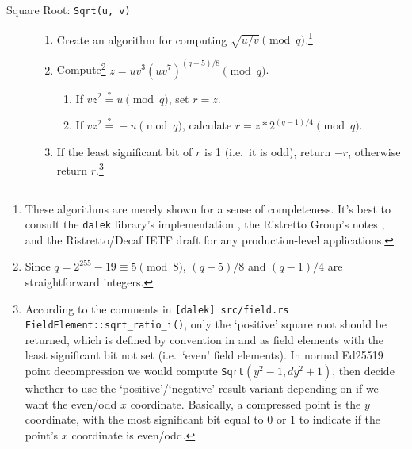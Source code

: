 \begin{description}
    \item [Square Root: {\tt Sqrt(u, v)}] \hfill
        \begin{enumerate}
            \item Create an algorithm for computing $\sqrt{u/v} \pmod q$.\footnote{These algorithms are merely shown for a sense of completeness. It's best to consult the {\tt dalek} library's implementation \cite{dalek-curve25519-lib}, the Ristretto Group's notes \cite{ristretto}, and the Ristretto/Decaf IETF draft \cite{ristretto-decaf-ietf} for any production-level applications.}
            \item Compute\footnote{Since $q = 2^{255}-19 \equiv 5 \pmod{8}$, $(q-5)/8$ and $(q-1)/4$ are straightforward integers.} \(z = u v^3 (u v^7)^{(q-5)/8} \pmod q\).
            \begin{enumerate}
                \item If \(v z^2 \stackrel{?}{=} u \pmod q\), set \(r = z\).
                \item If \(v z^2 \stackrel{?}{=} -u \pmod q\), calculate \(r = z*2^{(q-1)/4} \pmod q\).
            \end{enumerate}
            \item If the least significant bit of $r$ is 1 (i.e.\ it is odd), return $-r$, otherwise return $r$.\footnote{\label{footnote:point-comp-positive-convention-normal-decompression}According to the comments in {\tt [dalek] src/field.rs FieldElement::sqrt\_ratio\_i()}, only the `positive' square root should be returned, which is defined by convention in \cite{Bernstein2012-high-speed-high-security-ed25519} and \cite{ristretto-decaf-ietf} as field elements with the least significant bit not set (i.e.\ `even' field elements). In normal Ed25519 point decompression \cite{Bernstein2012-high-speed-high-security-ed25519} we would compute {\tt Sqrt}$(y^2 - 1, d y^2 + 1)$, then decide whether to use the `positive'/`negative' result variant depending on if we want the even/odd $x$ coordinate. Basically, a compressed point is the $y$ coordinate, with the most significant bit equal to 0 or 1 to indicate if the point's $x$ coordinate is even/odd.}
        \end{enumerate}


\end{description}
